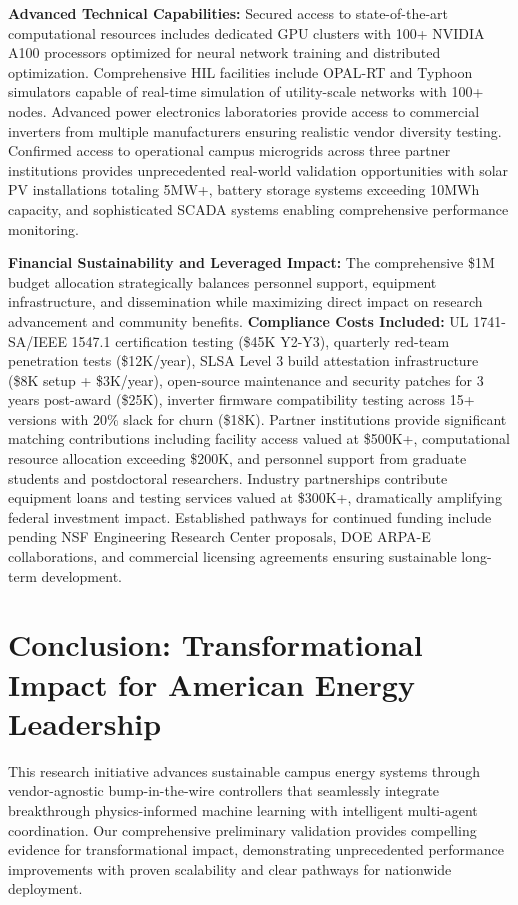 \documentclass[12pt]{article}
\begin{document}
\textbf{Advanced Technical Capabilities:} Secured access to state-of-the-art computational resources includes dedicated GPU clusters with 100+ NVIDIA A100 processors optimized for neural network training and distributed optimization. Comprehensive HIL facilities include OPAL-RT and Typhoon simulators capable of real-time simulation of utility-scale networks with 100+ nodes. Advanced power electronics laboratories provide access to commercial inverters from multiple manufacturers ensuring realistic vendor diversity testing. Confirmed access to operational campus microgrids across three partner institutions provides unprecedented real-world validation opportunities with solar PV installations totaling 5MW+, battery storage systems exceeding 10MWh capacity, and sophisticated SCADA systems enabling comprehensive performance monitoring.

\textbf{Financial Sustainability and Leveraged Impact:} The comprehensive \$1M budget allocation \cite{nrel2021} strategically balances personnel support, equipment infrastructure, and dissemination while maximizing direct impact on research advancement and community benefits. \textbf{Compliance Costs Included:} UL 1741-SA/IEEE 1547.1 certification testing (\$45K Y2-Y3), quarterly red-team penetration tests (\$12K/year), SLSA Level 3 build attestation infrastructure (\$8K setup + \$3K/year), open-source maintenance and security patches for 3 years post-award (\$25K), inverter firmware compatibility testing across 15+ versions with 20\% slack for churn (\$18K). Partner institutions provide significant matching contributions including facility access valued at \$500K+, computational resource allocation exceeding \$200K, and personnel support from graduate students and postdoctoral researchers. Industry partnerships contribute equipment loans and testing services valued at \$300K+, dramatically amplifying federal investment impact. Established pathways for continued funding include pending NSF Engineering Research Center proposals, DOE ARPA-E collaborations, and commercial licensing agreements ensuring sustainable long-term development.

\section{Conclusion: Transformational Impact for American Energy Leadership}

This research initiative advances sustainable campus energy systems through vendor-agnostic bump-in-the-wire controllers that seamlessly integrate breakthrough physics-informed machine learning with intelligent multi-agent coordination. Our comprehensive preliminary validation provides compelling evidence for transformational impact, demonstrating unprecedented performance improvements with proven scalability and clear pathways for nationwide deployment.
\end{document}

